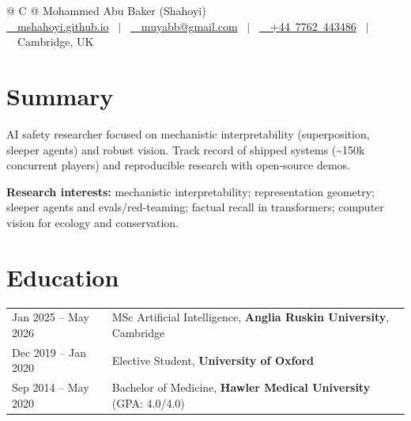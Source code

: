 \documentclass[a4paper,12pt]{article}
\begin{document}
\pagestyle{empty}

\begin{tabularx}{\linewidth}{@{} C @{}}
\Huge{Mohammed Abu Baker (Shahoyi)} \\[7.5pt]
\href{https://mshahoyi.github.io}{\raisebox{-0.05\height}\faGlobe\ \ mshahoyi.github.io} \ $|$ \
\href{mailto:muyabb@gmail.com}{\raisebox{-0.05\height}\faEnvelope\ \ muyabb@gmail.com} \ $|$ \
\href{tel:+447762443486}{\raisebox{-0.05\height}\faMobile\ \ +44\ 7762\ 443486} \ $|$ \
\raisebox{-0.05\height}\faMapMarker\ Cambridge, UK \\
\end{tabularx}

\section{Summary}
AI safety researcher focused on mechanistic interpretability (superposition, sleeper agents) and robust vision. Track record of shipped systems (\textasciitilde150k concurrent players) and reproducible research with open-source demos.

\textbf{Research interests:} mechanistic interpretability; representation geometry; sleeper agents and evals/red-teaming; factual recall in transformers; computer vision for ecology and conservation.

\section{Education}
\begin{tabularx}{\linewidth}{@{}l X@{}}
Jan 2025 -- May 2026 & MSc Artificial Intelligence, \textbf{Anglia Ruskin University}, Cambridge \\
Dec 2019 -- Jan 2020 & Elective Student, \textbf{University of Oxford} \\
Sep 2014 -- May 2020 & Bachelor of Medicine, \textbf{Hawler Medical University} \hfill (GPA: 4.0/4.0) \\
\end{tabularx}
\end{document}
